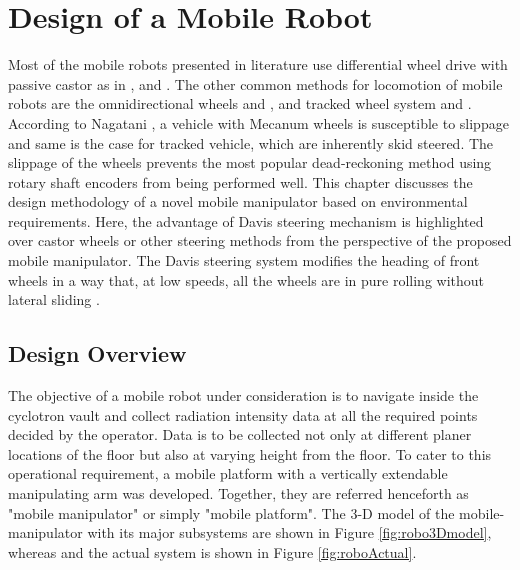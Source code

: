 \chapter{Design of a Mobile Robot}
\label{ch_3:Design}

Most of the mobile robots presented in literature use differential wheel drive  with passive castor as in \cite{saha1989kinematics}, \cite{yamamoto1992coordinating} and \cite{rajendran2004}. The other  common methods for locomotion of mobile robots are the omnidirectional wheels  \cite{pin1994new} and \cite{salih2006designing}, and tracked wheel system \cite{suthakorn2009design} and \cite{guarnieri2004development}. According  to  Nagatani \cite{nagatani2000improvement},  a  vehicle  with  Mecanum  wheels  is  susceptible  to slippage and same is the case for tracked vehicle, which are inherently skid steered. The slippage of the wheels prevents the most popular dead-reckoning method using rotary shaft  encoders   from  being  performed  well. This chapter   discusses the  design methodology of a novel mobile manipulator based on environmental requirements. Here, the advantage of  Davis steering mechanism is highlighted over castor wheels  or other steering methods from the perspective of the proposed mobile manipulator.   The Davis steering system modifies the heading of  front wheels in a way that, at low speeds, all the wheels are in pure rolling without lateral sliding \cite{wong2008theory}.  


\section{Design Overview}
 The objective of a  mobile robot under consideration is to navigate inside the cyclotron vault and collect radiation intensity data at all the required points decided by the operator. Data is to be collected not only at different planer locations of the floor but also at varying height from the floor. To cater to this operational requirement, a mobile platform with a vertically extendable manipulating arm was developed. Together, they are   referred henceforth as "mobile manipulator" or simply "mobile platform". The 3-D model of the mobile-manipulator with its major subsystems are shown in Figure \ref{fig:robo3Dmodel}, whereas  and the actual   system  is shown in Figure  \ref{fig:roboActual}. 

